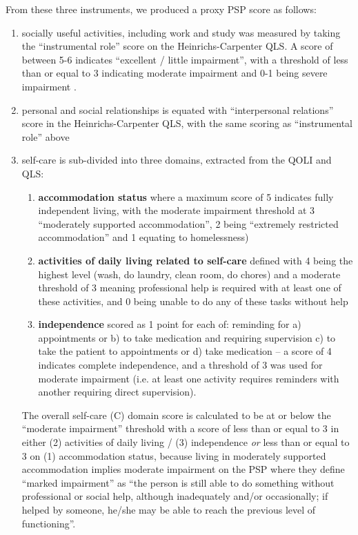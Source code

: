 \documentclass[a4paper,nobib]{article}
\begin{document}
From these three instruments, we produced a proxy PSP score as follows:
\begin{enumerate}[label=(\Alph*)]
	\item socially useful activities, including work and study was measured by taking the ``instrumental role'' score on the Heinrichs-Carpenter QLS.  A score of between 5-6 indicates ``excellent / little impairment'', with a threshold of less than or equal to 3 indicating moderate impairment and 0-1 being severe impairment \citep{heinrichs1984quality}.
	
	\item personal and social relationships is equated with ``interpersonal relations'' score in the Heinrichs-Carpenter QLS, with the same scoring as ``instrumental role'' above
	
	\item self-care is sub-divided into three domains, extracted from the QOLI and QLS:  
	\begin{enumerate}[label=(\arabic*)]
		\item \textbf{accommodation status} where a maximum score of 5 indicates fully independent living, with the moderate impairment threshold at 3 ``moderately supported accommodation'', 2 being ``extremely restricted accommodation'' and 1 equating to homelessness) 
		\item \textbf{activities of daily living related to self-care} defined with 4 being the highest level (wash, do laundry, clean room, do chores) and a moderate threshold of 3 meaning professional help is required with at least one of these activities, and 0 being unable to do any of these tasks without help
		\item \textbf{independence} scored as 1 point for each of: reminding for a) appointments or b) to take medication and requiring supervision c) to take the patient to appointments or d) take medication -- a score of 4 indicates complete independence, and a threshold of 3 was used for moderate impairment (i.e. at least one activity requires reminders with another requiring direct supervision).  
	\end{enumerate}
	The overall self-care (C) domain score is calculated to be at or below the ``moderate impairment'' threshold with a score of less than or equal to 3 in either (2) activities of daily living / (3) independence \emph{or} less than or equal to 3 on (1) accommodation status, because living in moderately supported accommodation implies moderate impairment on the PSP \cite{Morosini2000} where they define ``marked impairment'' as ``the person is still able to do something without professional or social help, although inadequately and/or occasionally; if helped by someone, he/she may be able to reach the previous level of functioning''.
	

\end{enumerate}
\end{document}
